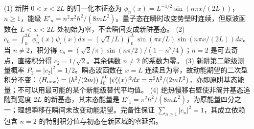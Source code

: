 (1) 新阱 \(0<x<2L\) 的归一化本征态为 \(\phi_n(x)=L^{-1/2}\sin(n\pi x/(2L))\)，\(n\ge1\)，能级 \(E'_n=n^2\pi^2\hbar^2/(8mL^2)\)。量子态在瞬时改变势壁时连续，但原波函数在 \(L<x<2L\) 处初始为零，不会瞬间变成新阱基态。
(2) \(c_n=\int_0^{2L}\phi_n^*(x)\psi_i(x)dx=(\sqrt2/L)\int_0^L\sin(\pi x/L)\sin(n\pi x/(2L))dx\)。当 \(n\ne2\)，积分得 \(c_n=(\sqrt2/\pi)\sin(n\pi/2)/(1-n^2/4)\)；\(n=2\) 是可去奇点，直接积分得 \(c_2=1/\sqrt2\)。其余偶数 \(n\ne2\) 的系数为零。
(3) 新阱第二能级测量概率 \(P_2=|c_2|^2=1/2\)。瞬态波函数在 \(x=L\) 连续且为零，故动能期望的二次型积分不变：\(\langle H_{\rm new}\rangle=(\hbar^2/(2m))\int_0^L|\psi_i'(x)|^2dx=\pi^2\hbar^2/(2mL^2)\)，亦即原阱基态能量；不可以用最可能的某个新能级替代平均值。
(4) 绝热慢移右壁使非简并基态追随到宽度 \(2L\) 的新基态，其末态能量是 \(E'_1=\pi^2\hbar^2/(8mL^2)\)，为原能量四分之一；理想瞬移在瞬间未改变动能期望。完备性保证 \(\sum_{n\ge1}|c_n|^2=1\)，其成立依赖包含 \(n=2\) 的特别积分值与初态在新区域的零延拓。
